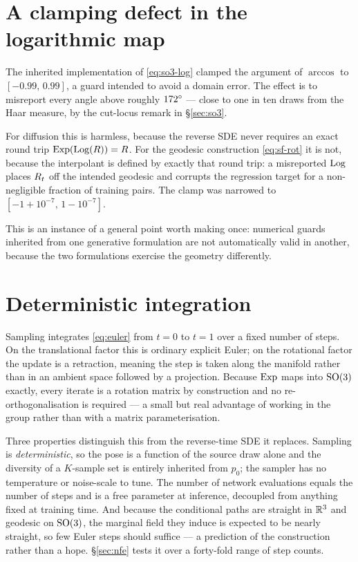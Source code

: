 \section{A clamping defect in the logarithmic map}
\label{sec:log-defect}

The inherited implementation of \eqref{eq:so3-log} clamped the argument of
$\arccos$ to $[-0.99,\,0.99]$, a guard intended to avoid a domain error. The
effect is to misreport every angle above roughly $172^{\circ}$ --- close to one
in ten draws from the Haar measure, by the cut-locus remark in
\S\ref{sec:so3}.

For diffusion this is harmless, because the reverse SDE never requires an
exact round trip $\operatorname{Exp}(\operatorname{Log}(R)) = R$. For the geodesic construction
\eqref{eq:sf-rot} it is not, because the interpolant is defined by exactly
that round trip: a misreported $\operatorname{Log}$ places $R_t$ off the intended
geodesic and corrupts the regression target for a non-negligible fraction of
training pairs. The clamp was narrowed to $[-1+10^{-7},\,1-10^{-7}]$.

This is an instance of a general point worth making once: numerical guards
inherited from one generative formulation are not automatically valid in
another, because the two formulations exercise the geometry differently.

\section{Deterministic integration}

Sampling integrates \eqref{eq:euler} from $t=0$ to $t=1$ over a fixed number
of steps. On the translational factor this is ordinary explicit Euler; on the
rotational factor the update is a retraction, meaning the step is taken along
the manifold rather than in an ambient space followed by a projection. Because
$\operatorname{Exp}$ maps into $\mathrm{SO}(3)$ exactly, every iterate is a rotation matrix by
construction and no re-orthogonalisation is required --- a small but real
advantage of working in the group rather than with a matrix parameterisation.

Three properties distinguish this from the reverse-time SDE it replaces.
Sampling is \emph{deterministic}, so the pose is a function of the source
draw alone and the diversity of a $K$-sample set is entirely inherited from
$p_0$; the sampler has no temperature or noise-scale to tune. The number of
network evaluations equals the number of steps and is a free parameter at
inference, decoupled from anything fixed at training time. And because the
conditional paths are straight in $\mathbb{R}^3$ and geodesic on $\mathrm{SO}(3)$, the
marginal field they induce is expected to be nearly straight, so few Euler
steps should suffice --- a prediction of the construction rather than a hope.
\S\ref{sec:nfe} tests it over a forty-fold range of step counts.

